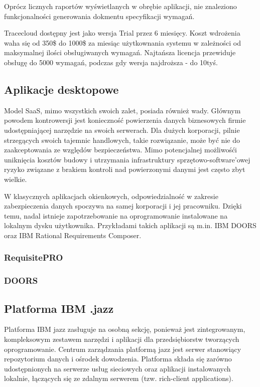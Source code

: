         Oprócz licznych raportów wyświetlanych w obrębie aplikacji, nie znaleziono funkcjonalności generowania dokmentu specyfikacji wymagań. 

        Tracecloud dostępny jest jako wersja Trial przez 6 miesięcy. Koszt wdrożenia waha się od 350\$ do 1000\$ za miesiąc użytkownania systemu w zależności od maksymalnej ilości obsługiwanych wymagań. Najtańsza licencja przewiduje obsługę do 5000 wymagań, podczas gdy wersja najdroższa - do 10tyś.

    \subsection{Aplikacje desktopowe}

      Model SaaS, mimo wszystkich swoich zalet, posiada również wady. Głównym powodem kontrowersji jest konieczność powierzenia danych biznesowych firmie udostępniającej narzędzie na swoich serwerach. Dla dużych korporacji, pilnie strzegących swoich tajemnic handlowych, takie rozwiązanie, może być nie do zaakceptowania ze względów bezpieczeństwa. Mimo potencjalnej możliwośći uniknięcia kosztów budowy i utrzymania infrastruktury sprzętowo-software'owej ryzyko związane z brakiem kontroli nad powierzonymi danymi jest często zbyt wielkie. 

      W klasycznych aplikacjach okienkowych, odpowiedzialność w zakresie zabezpieczenia danych spoczywa na samej korporacji i jej pracowniku. Dzięki temu, nadal istnieje zapotrzebowanie na oprogramowanie instalowane na lokalnym dysku użytkownika. Przykładami takich aplikacji są m.in. IBM DOORS oraz IBM Rational Requirements Composer.

      \subsubsection{RequisitePRO}
      \subsubsection{DOORS}

    \subsection{Platforma IBM .jazz}

      Platforma IBM jazz zasługuje na osobną sekcję, ponieważ jest zintegrowanym, kompleksowym zestawem narzędzi i aplikacji dla przedsiębiorstw tworzących oprogramowanie. Centrum zarządzania platformą jazz jest serwer stanowiący repozytorium danych i ośrodek dowodzenia. Platforma składa się zarówno udostępnionych na serwerze usług sieciowych oraz aplikacji instalowanych lokalnie, łączących się ze zdalnym serwerem (tzw. rich-client applications). 

